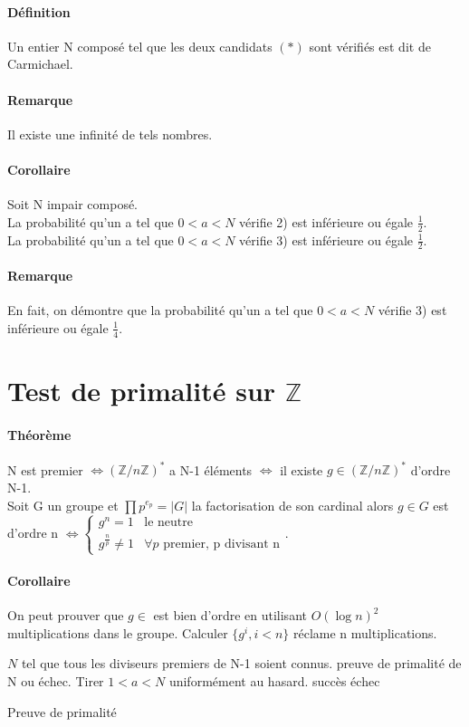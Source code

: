\documentclass[12pt,a4paper]{report}
\begin{document}
\paragraph{Définition\\}
Un entier N composé tel que les deux candidats $(*)$ sont vérifiés est dit de Carmichael.
\paragraph{Remarque\\}
Il existe une infinité de tels nombres.
\paragraph{Corollaire\\}
Soit N impair composé.\\
La probabilité qu'un a tel que $0<a<N$ vérifie 2) est inférieure ou égale  $\frac{1}{2}$. \\
La probabilité qu'un a tel que $0<a<N$ vérifie 3) est inférieure ou égale  $\frac{1}{2}$.
\paragraph{Remarque\\}
En fait, on démontre que la probabilité qu'un a tel que $0<a<N$ vérifie 3) est inférieure ou égale  $\frac{1}{4}$.
\section{Test de primalité sur $\mathbb{Z}$}
\paragraph{Théorème\\}
N est premier $\Leftrightarrow (\mathbb{Z}/n\mathbb{Z})^* $ a N-1 éléments $\Leftrightarrow $ il existe $g \in (\mathbb{Z}/n\mathbb{Z})^*$ d'ordre N-1.\\
Soit G un groupe et $\prod p^{e_p} = |G|$ la factorisation de son cardinal alors $g\in G$ est d'ordre n $ \Leftrightarrow \left\{\begin{array}{ll}
g^n=1 & \mbox{le neutre} \\
g^{\frac{n}{p}} \neq 1 & \forall p \mbox{ premier, p divisant n} \end{array}\right. $.
\paragraph{Corollaire\\}
On peut prouver que $g \in $ est bien d'ordre en utilisant $O(\log n)^2 $ multiplications dans le groupe.
Calculer $\{ g^i, i<n\}$ réclame n multiplications.
\begin{algorithm}[h!]
\begin{algorithmic}[1]
\REQUIRE $N$ tel que tous les diviseurs premiers de N-1 soient connus.
\ENSURE preuve de primalité de N ou échec. 
\STATE Tirer $1<a<N$ uniformément au hasard.
\RETURN succès
\ELSE \RETURN échec 
\ENDIF
\end{algorithmic}
\caption{Preuve de primalité}
\end{algorithm}
\end{document}

